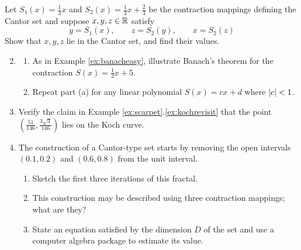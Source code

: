 \begin{exercises}
	\exstart Let $S_1(x)=\frac 13 x$ and $S_2(x)=\frac 13x+\frac 23$ be the contraction mappings defining the Cantor set and suppose $x,y,z\in\mathbb{R}$ satisfy
	\[
		y=S_1(x),\qquad z=S_2(y),\qquad x=S_2(z)
	\]
	Show that $x,y,z$ lie in the Cantor set, and find their values.
	
	  
	\begin{enumerate}\setcounter{enumi}{1}
	  
	  
	 	\item\begin{enumerate}
	    \item As in Example \ref{ex:banacheasy}, illustrate Banach's theorem for the contraction $S(x)=\frac 12x+5$.
	    \item Repeat part (a) for any linear polynomial $S(x)=cx+d$ where $\left| c\right|<1$. 
	  \end{enumerate}
	  
	  
	  \item Verify the claim in Example \ref*{ex:scarpet}.\ref{ex:kochrevisit} that the point $(\frac{51}{146},\frac{3\sqrt 3}{146})$ lies on the Koch curve.
	  
	  
	  \item The construction of a Cantor-type set starts by removing the open intervals $(0.1,0.2)$ and $(0.6,0.8)$ from the unit interval.
	  \begin{enumerate}
	    \item Sketch the first three iterations of this fractal.
	    \item This construction may be described using three contraction mappings; what are they?
	    \item State an equation satisfied by the dimension $D$ of the set and use a computer algebra package to estimate its value.
	  \end{enumerate}
	  

\end{enumerate}
\end{exercises}
